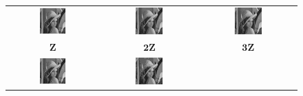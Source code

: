 \documentclass[11pt,a4paper]{article}
\begin{document}
\begin{figure}[!htbp]
	\centering
	\begin{tabular}{ccc} 
		\includegraphics[width=0.3\textwidth]{pro7/dct/8_31_a}&
		\includegraphics[width=0.3\textwidth]{pro7/dct/8_31_b}&
		\includegraphics[width=0.3\textwidth]{pro7/dct/8_31_c}\\
		 $\mathbf{Z}$& $\mathbf{2Z}$ & $\mathbf{3Z}$\\
		\includegraphics[width=0.3\textwidth]{pro7/dct/8_31_d}&
		\includegraphics[width=0.3\textwidth]{pro7/dct/8_31_e}&

\end{tabular}
\end{figure}
\end{document}
